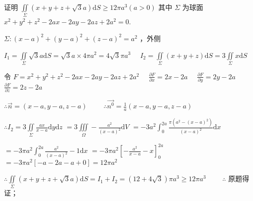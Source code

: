 \begin{problem}[points = 5]
证明 $\iint\limits_{\Sigma} (x + y + z + \sqrt{3}a)\mathrm{d}S \geq 12\pi a^3(a > 0)$
其中 $\Sigma$ 为球面 $x^2 + y^2 + z^2 - 2ax - 2ay - 2az + 2a^2 = 0$.
\end{problem}
\begin{solution}
    $\Sigma: (x - a)^2 + (y - a)^2 + (z - a)^2 = a^2$ ，外侧

    $I_1 = \iint\limits_{\Sigma} \sqrt{3}a\mathrm{d}S = \sqrt{3}a \times 4\pi a^2 = 4\sqrt{3}\pi a^3 \quad$
    $I_2 = \iint\limits_{\Sigma} (x + y + z)\mathrm{d}S = 3\iint\limits_{\Sigma} x\mathrm{d}S$

    令 $F = x^2 + y^2 + z^2 - 2ax - 2ay - 2az + 2a^2 \quad$
    $\frac{\partial F}{\partial x} = 2x - 2a \quad$
    $\frac{\partial F}{\partial y} = 2y - 2a \quad$
    $\frac{\partial F}{\partial z} = 2z - 2a$

    $\therefore \vec{n} = (x - a, y - a, z - a) \qquad$
    $\therefore \vec{n^0} = \frac{1}{a}(x - a, y - a, z - a)$

    $\therefore I_2 = 3\iint\limits_{\Sigma} \frac{ax}{x - a}\mathrm{d}y\mathrm{d}z$
    $= 3\iiint\limits_{\Omega} -\frac{a^2}{(x - a)^2}\mathrm{d}V$
    $= -3a^2\int_0^{2a} \frac{\pi\left(a^2 - (x - a)^2\right)}{(x - a)^2}\mathrm{d}x$

    $= -3\pi a^2\int_0^{2a} \frac{a^2}{(x - a)^2} - 1\mathrm{d}x$
    $= -3\pi a^2\left[-\frac{a^2}{x - a} - x\right]_0^{2a}$
    $= -3\pi a^2\left[-a - 2a - a + 0\right] = 12\pi a^2$

    $\therefore \iint\limits_{\Sigma} (x + y + z + \sqrt{3}a)\mathrm{d}S = I_1 + I_2 = (12 + 4\sqrt{3})\pi a^3 \geq 12\pi a^3 \qquad$
    $\therefore$ 原题得证；
\end{solution}
